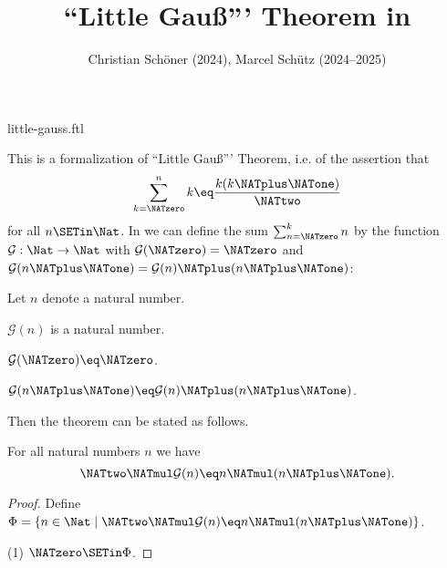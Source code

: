 \documentclass{article}
\title{``Little Gauß''' Theorem in \Naproche}
\author{Christian Schöner (2024), Marcel Schütz (2024--2025)}
\date{}
\newcommand{\gauss}{\mathcal{G}}
\begin{document}
\begin{smodule}{little-gauss.ftl}
\maketitle


\noindent This is a formalization of ``Little Gauß''' Theorem, i.e. of
the assertion that
\[\sum_{k = \NATzero}^n k \eq \frac{k(k \NATplus \NATone)}\NATtwo\]
for all $n \SETin \Nat$.
In \Naproche we can define the sum $\sum_{n = \NATzero}^k n$ by the function
$\gauss : \Nat \to \Nat$ with $\gauss(\NATzero) = \NATzero$ and
$\gauss(n \NATplus \NATone) = \gauss(n) \NATplus (n \NATplus \NATone)$:

\begin{forthel}
  Let $n$ denote a natural number.

  \begin{signature*}
    $\gauss(n)$ is a natural number.
  \end{signature*}

  \begin{axiom*}
    $\gauss(\NATzero) \eq \NATzero$.
  \end{axiom*}

  \begin{axiom*}
    $\gauss(n \NATplus \NATone) \eq \gauss(n) \NATplus (n \NATplus \NATone)$.
  \end{axiom*}
\end{forthel}

\noindent Then the theorem can be stated as follows.

\begin{forthel}
  \begin{theorem*}[title=Little Gauß,id=little_gauss]
    For all natural numbers $n$ we have
    \[\NATtwo \NATmul \gauss(n) \eq n \NATmul (n \NATplus \NATone).\]
  \end{theorem*}
  \begin{proof}
    Define $\Phi = \{ n \in \Nat \mid \NATtwo \NATmul \gauss(n) \eq n \NATmul (n \NATplus \NATone) \}$.
    
    (1) $\NATzero \SETin \Phi$.


\end{proof}
\end{forthel}
\end{smodule}
\end{document}

